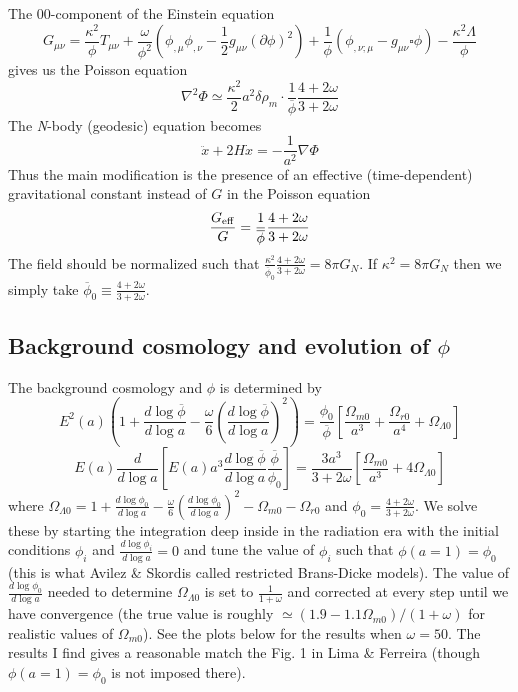 \documentclass[usenatbib]{article}
\begin{document}
The $00$-component of the Einstein equation
$$G_{\mu\nu} = \frac{\kappa^2}{\phi}T_{\mu\nu} + \frac{\omega}{\phi^2}(\phi_{,\mu}\phi_{,\nu} - \frac{1}{2}g_{\mu\nu}(\partial\phi)^2) + \frac{1}{\phi}(\phi_{,\nu;\mu} - g_{\mu\nu}\square\phi) - \frac{\kappa^2\Lambda}{\phi}$$
gives us the Poisson equation
$$\nabla^2\Phi \simeq \frac{\kappa^2}{2} a^2\delta\rho_m \cdot \frac{1}{\overline{\phi}}\frac{4+2\omega}{3+2\omega}$$
The {\it N}-body (geodesic) equation becomes
$$\ddot{x} + 2H\dot{x} = -\frac{1}{a^2}\nabla\Phi$$
Thus the main modification is the presence of an effective (time-dependent) gravitational constant instead of $G$ in the Poisson equation
$$\frac{G_{\rm eff}}{G} = \frac{1}{\overline{\phi}}\frac{4+2\omega}{3+2\omega}$$
The field should be normalized such that $\frac{\kappa^2}{\overline{\phi}_0}\frac{4+2\omega}{3+2\omega} = 8\pi G_N$. If $\kappa^2 = 8\pi G_N$ then we simply take $\overline{\phi}_0 \equiv \frac{4+2\omega}{3+2\omega}$.

\subsection*{Background cosmology and evolution of $\phi$}

The background cosmology and $\phi$ is determined by
$$E^2(a)\left(1 + \frac{d\log \overline{\phi}}{d\log a} - \frac{\omega}{6}\left(\frac{d\log \overline{\phi}}{d\log a}\right)^2\right) = \frac{\phi_0}{\overline{\phi}}\left[\frac{\Omega_{m0}}{a^3} + \frac{\Omega_{r0}}{a^4} + \Omega_{\Lambda 0}\right]$$
$$E(a)\frac{d}{d\log a}\left[E(a)a^3 \frac{d\log \overline{\phi}}{d\log a} \frac{\overline{\phi}}{\phi_0}\right] = \frac{3 a^3}{3+2\omega}\left[\frac{\Omega_{m0}}{a^3} + 4 \Omega_{\Lambda 0}\right]$$
where $\Omega_{\Lambda 0} = 1 + \frac{d\log \phi_0}{d\log a} - \frac{\omega}{6}\left(\frac{d\log \phi_0}{d\log a}\right)^2 - \Omega_{m0} - \Omega_{r0}$ and $\phi_0 = \frac{4+2\omega}{3+2\omega}$. We solve these by starting the integration deep inside in the radiation era with the initial conditions $\phi_i$ and $\frac{d\log \phi_i}{d\log a} = 0$ and tune the value of $\phi_i$ such that $\phi(a=1) = \phi_0$ (this is what Avilez \& Skordis called restricted Brans-Dicke models). The value of $\frac{d\log \phi_0}{d\log a}$ needed to determine $\Omega_{\Lambda 0}$ is set to $\frac{1}{1+\omega}$ and corrected at every step until we have convergence (the true value is roughly $\simeq (1.9 - 1.1\Omega_{m0})/(1+\omega)$ for realistic values of $\Omega_{m0}$). See the plots below for the results when $\omega = 50$. The results I find gives a reasonable match the Fig. 1 in Lima \& Ferreira (though $\phi(a=1) = \phi_0$ is not imposed there).
\end{document}
